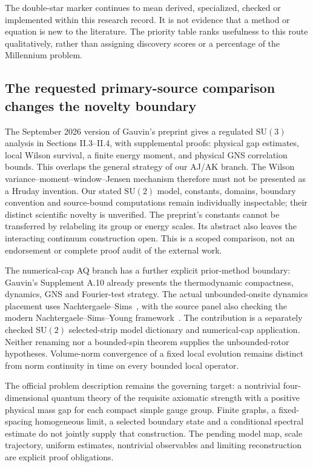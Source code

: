 The double-star marker continues to mean derived, specialized, checked or implemented within this research record. It is not evidence that a method or equation is new to the literature. The priority table ranks usefulness to this route qualitatively, rather than assigning discovery scores or a percentage of the Millennium problem.

\subsection{The requested primary-source comparison changes the novelty boundary}
The September 2026 version of Gauvin's preprint \cite{gauvin2026} gives a regulated $\mathrm{SU}(3)$ analysis in Sections II.3--II.4, with supplemental proofs: physical gap estimates, local Wilson survival, a finite energy moment, and physical GNS correlation bounds. This overlaps the general strategy of our AJ/AK branch. The Wilson variance--moment--window--Jensen mechanism therefore must not be presented as a Hruday invention. Our stated $\mathrm{SU}(2)$ model, constants, domains, boundary convention and source-bound computations remain individually inspectable; their distinct scientific novelty is unverified. The preprint's constants cannot be transferred by relabeling its group or energy scales. Its abstract also leaves the interacting continuum construction open. This is a scoped comparison, not an endorsement or complete proof audit of the external work.

The numerical-cap AQ branch has a further explicit prior-method boundary: Gauvin's Supplement A.10 already presents the thermodynamic compactness, dynamics, GNS and Fourier-test strategy. The actual unbounded-onsite dynamics placement uses Nachtergaele--Sims~\citep{nachtergaele2014dynamics}, with the source panel also checking the modern Nachtergaele--Sims--Young framework~\citep{nachtergaele2019quasilocality}. The contribution is a separately checked $\mathrm{SU}(2)$ selected-strip model dictionary and numerical-cap application. Neither renaming nor a bounded-spin theorem supplies the unbounded-rotor hypotheses. Volume-norm convergence of a fixed local evolution remains distinct from norm continuity in time on every bounded local operator.

The official problem description \cite{jaffe_witten} remains the governing target: a nontrivial four-dimensional quantum theory of the requisite axiomatic strength with a positive physical mass gap for each compact simple gauge group. Finite graphs, a fixed-spacing homogeneous limit, a selected boundary state and a conditional spectral estimate do not jointly supply that construction. The pending model map, scale trajectory, uniform estimates, nontrivial observables and limiting reconstruction are explicit proof obligations.

